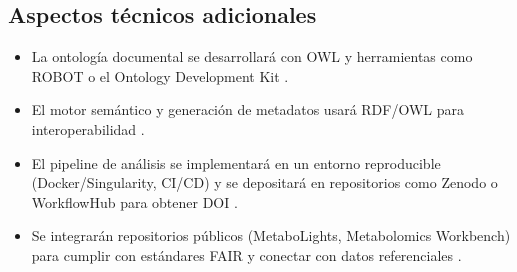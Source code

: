 \subsection{Aspectos técnicos adicionales}
\begin{itemize}
  \item La ontología documental se desarrollará con OWL y herramientas como ROBOT o el Ontology Development Kit \cite{ODK}.
  \item El motor semántico y generación de metadatos usará RDF/OWL para interoperabilidad \cite{BestPracticesOntologies}.
  \item El pipeline de análisis se implementará en un entorno reproducible (Docker/Singularity, CI/CD) y se depositará en repositorios como Zenodo o WorkflowHub para obtener DOI \cite{FAIR_multomics}.
  \item Se integrarán repositorios públicos (MetaboLights, Metabolomics Workbench) para cumplir con estándares FAIR y conectar con datos referenciales \cite{MetaboLights} \cite{MetabolomicsWorkbench}.
\end{itemize}
